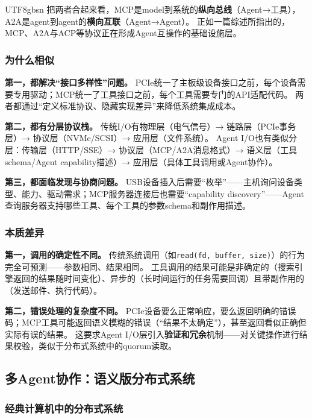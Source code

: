 \documentclass[11pt,a4paper]{article}
\begin{document}
\begin{CJK*}{UTF8}{gbsn}
把两者合起来看，MCP是model到系统的\textbf{纵向总线}（Agent→工具），A2A是agent到agent的\textbf{横向互联}（Agent→Agent）。
正如一篇综述所指出的，MCP、A2A与ACP等协议正在形成Agent互操作的基础设施层\cite{agentprotocols2025}。

\subsubsection{为什么相似}

\textbf{第一，都解决``接口多样性''问题。}
PCIe统一了主板级设备接口之前，每个设备需要专用驱动；MCP统一了工具接口之前，每个工具需要专门的API适配代码。
两者都通过``定义标准协议、隐藏实现差异''来降低系统集成成本。

\textbf{第二，都有分层协议栈。}
传统I/O有物理层（电气信号）→ 链路层（PCIe事务层）→ 协议层（NVMe/SCSI）→ 应用层（文件系统）。
Agent I/O也有类似分层：传输层（HTTP/SSE）→ 协议层（MCP/A2A消息格式）→ 语义层（工具schema/Agent capability描述）→ 应用层（具体工具调用或Agent协作）。

\textbf{第三，都面临发现与协商问题。}
USB设备插入后需要``枚举''——主机询问设备类型、能力、驱动需求；MCP服务器连接后也需要``capability discovery''——Agent查询服务器支持哪些工具、每个工具的参数schema和副作用描述。

\subsubsection{本质差异}

\textbf{第一，调用的确定性不同。}
传统系统调用（如\texttt{read(fd, buffer, size)}）的行为完全可预测——参数相同、结果相同。
工具调用的结果可能是非确定的（搜索引擎返回的结果随时间变化）、异步的（长时间运行的任务需要回调）且带副作用的（发送邮件、执行代码）。

\textbf{第二，错误处理的复杂度不同。}
PCIe设备要么正常响应，要么返回明确的错误码；MCP工具可能返回语义模糊的错误（``结果不太确定''），甚至返回看似正确但实际有误的结果。
这要求Agent I/O层引入\textbf{验证和冗余}机制——对关键操作进行结果校验，类似于分布式系统中的quorum读取。

\subsection{多Agent协作：语义版分布式系统}
\label{sec:distributed}

\subsubsection{经典计算机中的分布式系统}


\end{CJK*}
\end{document}

